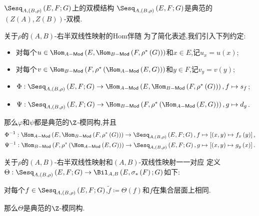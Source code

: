\begin{proposition}{$\Sesq_{A,(B,\rho)}\left(E,F;G\right)$上的双模结构}{}
	$\Sesq_{A,(B,\rho)}\left(E,F;G\right)$是典范的$\left(Z\left(A\right),Z\left(B\right)\right)$-双模.
\end{proposition}

\begin{proposition}{关于$\rho$的$\left(A,B\right)$-右半双线性映射的Hom伴随}{}
	为了简化表述,我们引入下列约定:
	\begin{itemize}
		\item 对每个$u\in\Hom_{A-\mathsf{Mod}}\left(E,\Hom_{B-\mathsf{Mod}}\left(F,\rho^{\ast}\left(G\right)\right)\right)$和$x\in E$,记$u_{x}=u\left(x\right)$;
		\item 对每个$v\in\Hom_{B-\mathsf{Mod}}\left(F,\rho^{\ast}\left(\Hom_{A-\mathsf{Mod}}\left(E,G\right)\right)\right)$和$y\in F$,记$v_{y}=v\left(y\right)$;
		\item $\Phi:\Sesq_{A,(B,\rho)}\left(E,F;G\right)\to\Hom_{A-\mathsf{Mod}}\left(E,\Hom_{B-\mathsf{Mod}}\left(F,\rho^{\ast}\left(G\right)\right)\right),f\mapsto s_{f}$;
		\item $\Psi:\Sesq_{A,(B,\rho)}\left(E,F;G\right)\to\Hom_{B-\mathsf{Mod}}\left(F,\rho^{\ast}\left(\Hom_{A-\mathsf{Mod}}\left(E,G\right)\right)\right),g\mapsto d_{g}$.
	\end{itemize}
	那么$\varphi$和$\psi$都是典范的$\Z$-模同构,并且
	\begin{gather*}
		\Phi^{-1}:\Hom_{A-\mathsf{Mod}}\left(E,\Hom_{B-\mathsf{Mod}}\left(F,\rho^{\ast}\left(G\right)\right)\right)\to\Sesq_{A,(B,\rho)}\left(E,F;G\right),f\mapsto\left[\left(x,y\right)\mapsto f_{x}\left(y\right)\right],\\
		\Psi^{-1}:\Hom_{B-\mathsf{Mod}}\left(F,\rho^{\ast}\left(\Hom_{A-\mathsf{Mod}}\left(E,G\right)\right)\right)\to\Sesq_{A,(B,\rho)}\left(E,F;G\right),g\mapsto\left[\left(x,y\right)\mapsto g_{y}\left(x\right)\right].
	\end{gather*}
\end{proposition}

\begin{proposition}{关于$\rho$的$\left(A,B\right)$-右半双线性映射和$\left(A,B\right)$-双线性映射一一对应}{}
	定义$\Theta:\Sesq_{A,(B,\rho)}\left(E,F;G\right)\to\Bil_{A,B}\left(E,\sigma_{\ast}\left(F\right);G\right)$如下:
	\begin{center}
		对每个$f\in\Sesq_{A,(B,\rho)}\left(E,F;G\right)$,$\tilde{f}\coloneq\Theta\left(f\right)$和$f$在集合层面上相同.
	\end{center}
	那么$\Theta$是典范的$\Z$-模同构.
\end{proposition}

